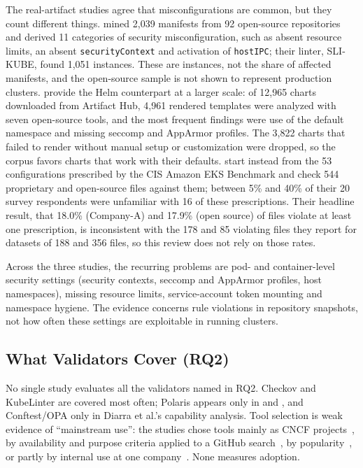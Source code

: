 \documentclass[sigconf,nonacm]{acmart}
\begin{document}
The real-artifact studies agree that misconfigurations are common, but they count different things. \citet{rahman2023} mined 2,039 manifests from 92 open-source repositories and derived 11 categories of security misconfiguration, such as absent resource limits, an absent \texttt{securityContext} and activation of \texttt{hostIPC}; their linter, SLI-KUBE, found 1,051 instances. These are instances, not the share of affected manifests, and the open-source sample is not shown to represent production clusters. \citet{minna2025} provide the Helm counterpart at a larger scale: of 12,965 charts downloaded from Artifact Hub, 4,961 rendered templates were analyzed with seven open-source tools, and the most frequent findings were use of the default namespace and missing seccomp and AppArmor profiles. The 3,822 charts that failed to render without manual setup or customization were dropped, so the corpus favors charts that work with their defaults. \citet{shamim2025} start instead from the 53 configurations prescribed by the CIS Amazon EKS Benchmark and check 544 proprietary and open-source files against them; between 5\% and 40\% of their 20 survey respondents were unfamiliar with 16 of these prescriptions. Their headline result, that 18.0\% (Company-A) and 17.9\% (open source) of files violate at least one prescription, is inconsistent with the 178 and 85 violating files they report for datasets of 188 and 356 files, so this review does not rely on those rates.

Across the three studies, the recurring problems are pod- and container-level security settings (security contexts, seccomp and AppArmor profiles, host namespaces), missing resource limits, service-account token mounting and namespace hygiene. The evidence concerns rule violations in repository snapshots, not how often these settings are exploitable in running clusters.

\subsection{What Validators Cover (RQ2)}

No single study evaluates all the validators named in RQ2. Checkov and KubeLinter are covered most often; Polaris appears only in \citet{krieger2026} and \citet{diarra2024}, and Conftest/OPA only in Diarra et al.'s capability analysis. Tool selection is weak evidence of ``mainstream use'': the studies chose tools mainly as CNCF projects~\cite{minna2025}, by availability and purpose criteria applied to a GitHub search~\cite{eom2026}, by popularity~\cite{krieger2026}, or partly by internal use at one company~\cite{shamim2025}. None measures adoption.
\end{document}
